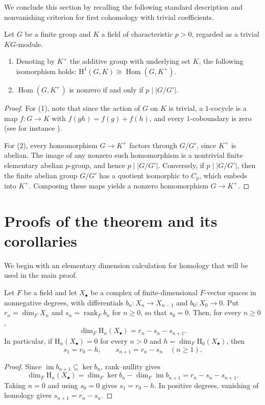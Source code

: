 \documentclass[11pt,a4paper]{amsart}
\numberwithin{equation}{section}
\DeclareMathOperator{\Hom}{Hom}
\DeclareMathOperator{\im}{im}
\DeclareMathOperator{\rank}{rank}
\newcommand{\HH}{\mathrm H}
\begin{document}
We conclude this section by recalling the following standard description and nonvanishing criterion for first cohomology with trivial coefficients.
\begin{lemma}\label{remarkone} Let $G$ be a finite group and $K$ a field of characteristic $p>0$, regarded as a trivial $KG$-module.
    \begin{enumerate}
        \item Denoting by $K^+$ the additive group with underlying set $K$, the following isomorphism holds: $\HH^1(G, K)\cong \Hom(G, K^+)$. 
\item $\Hom(G, K^+)$ is nonzero if and only if $p\mid|G/G'|$. 
    \end{enumerate}
\end{lemma}
\begin{proof}
For (1), note that since the action of $G$ on $K$ is trivial, a $1$-cocycle is a map $f:G\to K$
with $f(gh)=f(g)+f(h)$, and every $1$-coboundary is zero (see for instance \cite[Definition~1.2.7 and the following paragraph,
p.~17]{Lin}).

For (2), every homomorphism $G\to K^+$ factors through $G/G'$,
since $K^+$ is abelian. The image of any nonzero such homomorphism is  a nontrivial
finite elementary abelian $p$-group, and hence $p\mid|G/G'|$. 
Conversely, if $p\mid |G/G'|$, then the finite abelian group $G/G'$ has a quotient isomorphic to $C_p$, which embeds into $K^+$. Composing these maps yields a nonzero homomorphism $G\rightarrow K^+$.
\end{proof}
\section{Proofs of the theorem and its corollaries}
We begin with an elementary dimension calculation for homology that will be used in the main proof.


\begin{lemma}\label{lem:homology-dimension}
Let $F$ be a field and let $X_\bullet$ be a complex of
finite-dimensional $F$-vector spaces in nonnegative degrees,
with differentials $b_n:X_n\to X_{n-1}$ and $b_0:X_0\to0$.
Put $r_n=\dim_F X_n$ and $s_n=\rank_F b_n$ for $n\geq0$,
so that $s_0=0$. Then, for every $n\geq0$,
\begin{equation}\label{eq:homology-dimension}
 \dim_F\HH_n(X_\bullet)=r_n-s_n-s_{n+1}.
\end{equation}
In particular, if $\HH_n(X_\bullet)=0$ for every $n>0$ and
$h=\dim_F\HH_0(X_\bullet)$, then
\[
 s_1=r_0-h,\qquad
 s_{n+1}=r_n-s_n\quad(n\geq1).
\]
\end{lemma}
\begin{proof}
Since $\im b_{n+1}\subseteq\ker b_n$, rank--nullity gives
\[
 \dim_F\HH_n(X_\bullet)
 =\dim_F\ker b_n-\dim_F\im b_{n+1}
 =r_n-s_n-s_{n+1}.
\]
Taking $n=0$ and using $s_0=0$ gives $s_1=r_0-h$.
In positive degrees, vanishing of homology gives
$s_{n+1}=r_n-s_n$.
\end{proof}
\end{document}
